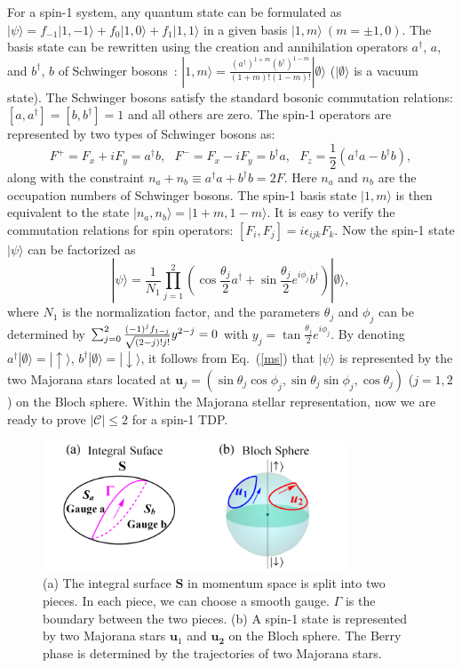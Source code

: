 \documentclass[aps,prl,floatfix,twocolumn,reprint]{revtex4}
\begin{document}
For a spin-1 system, any quantum state can be formulated as $|\psi \rangle
=f_{-1}|1,-1\rangle +f_{0}|1,0\rangle +f_{1}|1,1\rangle $ in a given basis $%
|1,m\rangle ~(m=\pm 1,0)$. The basis state can be rewritten using the
creation and annihilation operators $a^{\dag }$, $a$, and $b^{\dag }$, $b$
of Schwinger bosons~\cite{schwinger}: $|1,m\rangle =\frac{(a^{\dag
})^{1+m}(b^{\dag })^{1-m}}{(1+m)!(1-m)!}|\emptyset \rangle$ ($|\emptyset
\rangle $ is a vacuum state). The Schwinger bosons satisfy the standard  bosonic commutation relations: $[a,a^{\dag}]=[b,b^{\dag}]=1$ and all others are zero. The spin-1 operators are represented by two types of Schwinger bosons as:
\begin{equation}
F^{+}=F_x+i F_y=a^{\dag}b,~~~F^{-}=F_x-i F_y=b^{\dag}a,~~~F_z=\frac{1}{2}(a^{\dag}a-b^{\dag}b),
\end{equation}
along with the constraint $n_a+n_b\equiv a^{\dag}a+b^{\dag}b=2F$. Here $n_a$ and $n_b$ are the occupation numbers of Schwinger bosons. The spin-1 basis state $|1,m\rangle$ is then equivalent to the state $|n_a,n_b\rangle=|1+m,1-m\rangle$. It is easy to verify the commutation relations for spin operators: $[F_i,F_j]=i\epsilon_{ijk}F_k$. Now the spin-1 state $|\psi \rangle $ can be factorized 
as~\cite{majorana1,schwinger,majorana2,majorana3,majorana4,majorana5}
\begin{equation}
|\psi \rangle =\frac{1}{N_{1}}\prod_{j=1}^{2}(\cos \frac{\theta _{j}}{2}%
a^{\dag }+\sin \frac{\theta _{j}}{2}e^{i\phi _{j}}b^{\dag })|\emptyset
\rangle ,  \label{ms}
\end{equation}%
where $N_{1}$ is the normalization factor, and the parameters $\theta
_{j}$ and $\phi _{j}$ can be determined by $\sum_{j=0}^{2}\frac{%
(-1)^{j}f_{1-j}}{\sqrt{(2-j)!j!}}y^{2-j}=0$ with $y_{j}=\tan \frac{\theta
_{j}}{2}e^{i\phi _{j}}$. By denoting $a^{\dag }|\emptyset \rangle =|\uparrow
\rangle $, $b^{\dag }|\emptyset \rangle =|\downarrow \rangle $, 
it follows from Eq.~(\ref{ms}) that $|\psi\rangle $ is represented by the two Majorana stars located
at $\bm{u}_{j}=(\sin \theta _{j}\cos \phi _{j},\sin \theta _{j}\sin \phi
_{j},\cos \theta _{j})$ ($j=1,2$) on the Bloch sphere. Within the Majorana
stellar representation, now we are ready to prove $|\mathcal{C}|\leq 2$ for a
spin-1 TDP.
\begin{figure}[h]
\centering
\includegraphics[width=3.6in]{bloch_sphere.pdf}
\caption{(a) The integral surface $\bm{S}$ in momentum space is split into two pieces. In each piece, we can choose a smooth gauge. $\Gamma $
is the boundary between the two pieces. (b) A spin-1 state is
represented by two Majorana stars $\bm{u}_{1}$ and $\bm{u_2}$ on the Bloch
sphere. The Berry phase is determined by the trajectories of two Majorana
stars.}
\label{figchern2}
\end{figure}
\end{document}
